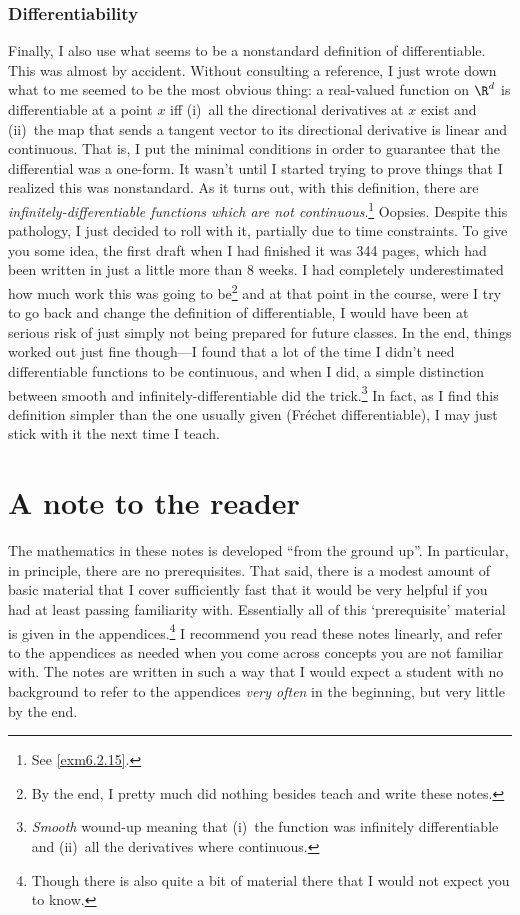 \subsubsection{Differentiability}

Finally, I also use what seems to be a nonstandard definition of differentiable.  This was almost by accident.  Without consulting a reference, I just wrote down what to me seemed to be the most obvious thing:  a real-valued function on $\R ^d$ is differentiable at a point $x$ iff (i)~all the directional derivatives at $x$ exist and (ii)~the map that sends a tangent vector to its directional derivative is linear and continuous.  That is, I put the minimal conditions in order to guarantee that the differential was a one-form.  It wasn't until I started trying to prove things that I realized this was nonstandard.  As it turns out, with this definition, there are \emph{infinitely-differentiable functions which are not continuous}.\footnote{See \cref{exm6.2.15}.}  Oopsies.  Despite this pathology, I just decided to roll with it, partially due to time constraints.  To give you some idea, the first draft when I had finished it was 344 pages, which had been written in just a little more than 8 weeks.  I had completely underestimated how much work this was going to be\footnote{By the end, I pretty much did nothing besides teach and write these notes.} and at that point in the course, were I try to go back and change the definition of differentiable, I would have been at serious risk of just simply not being prepared for future classes.  In the end, things worked out just fine though---I found that a lot of the time I didn't need differentiable functions to be continuous, and when I did, a simple distinction between smooth and infinitely-differentiable did the trick.\footnote{\emph{Smooth} wound-up meaning that (i)~the function was infinitely differentiable and (ii)~all the derivatives where continuous.}  In fact, as I find this definition simpler than the one usually given (Fr\'{e}chet differentiable), I may just stick with it the next time I teach.

\section*{A note to the reader}

The mathematics in these notes is developed ``from the ground up''.  In particular, in principle, there are no prerequisites.  That said, there is a modest amount of basic material that I cover sufficiently fast that it would be very helpful if you had at least passing familiarity with.  Essentially all of this `prerequisite' material is given in the appendices.\footnote{Though there is also quite a bit of material there that I would not expect you to know.}  I recommend you read these notes linearly, and refer to the appendices as needed when you come across concepts you are not familiar with.  The notes are written in such a way that I would expect a student with no background to refer to the appendices \emph{very often} in the beginning, but very little by the end.

